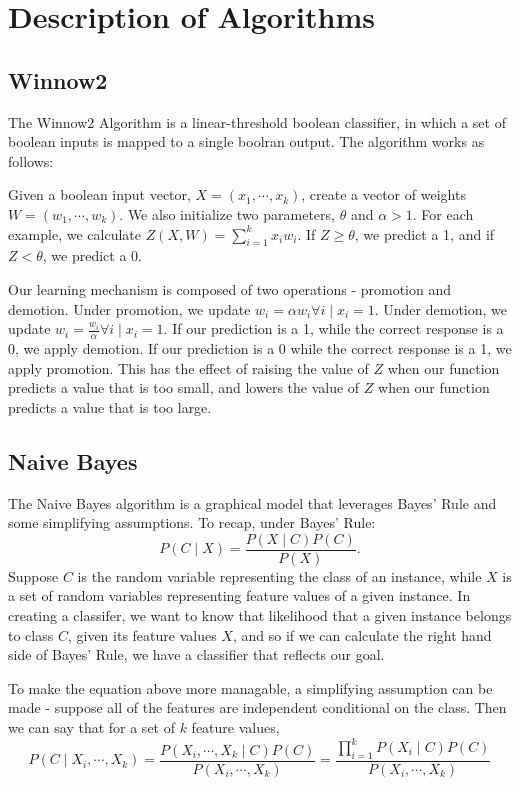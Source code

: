 \documentclass{amsart}
\begin{document}
    \section{Description of Algorithms}
    \subsection*{Winnow2}
    The Winnow2 Algorithm is a linear-threshold boolean classifier, in which a set of boolean inputs is mapped
    to a single boolran output. The algorithm works as follows:

    Given a boolean input vector, $X = (x_1, \cdots, x_k)$,  create a vector of weights $W = (w_1, \cdots, w_k)$.
    We also initialize two parameters, $\theta$ and $\alpha > 1$.
    For each example, we calculate $Z(X, W) = \sum_{i=1}^k x_i w_i$. If $Z \geq \theta$, we
    predict a 1, and if $Z < \theta$, we predict a 0.

    Our learning mechanism is composed of two operations - promotion and demotion.
    Under promotion, we update $w_i = \alpha w_i \forall i \mid x_i = 1$. Under demotion,
    we update $w_i =  \frac{w_i}{\alpha} \forall i \mid x_i = 1$. If our prediction is a 1, while
    the correct response is a 0, we apply demotion. If our prediction is a 0 while the correct
    response is a 1, we apply promotion. This has the effect of raising the value of $Z$ when our
    function predicts a value that is too small, and lowers the value of $Z$ when our
    function predicts a value that is too large.


    \subsection*{Naive Bayes}
    The Naive Bayes algorithm is a graphical model that leverages Bayes' Rule and some simplifying
    assumptions. To recap, under Bayes' Rule:
    \[
        P(C \mid X) = \frac{P(X \mid C) P(C)}{P(X)}.
    \]
    Suppose $C $ is the random variable representing the class of an instance, while $X$ is a
    set of random variables representing feature values of a given instance. In creating a classifer,
    we want to know that likelihood that a given instance belongs to class $C$, given its feature values $X$,
    and so if we can calculate the right hand side of Bayes' Rule, we have a classifier that reflects our goal.

    To make the equation above more managable, a simplifying assumption can be made - suppose all
    of the features are independent conditional on the class. Then we can say that for a set
    of $k$ feature values,
    \[
        P(C \mid X_i, \cdots, X_k ) = \frac{
            P(X_i, \cdots, X_k\mid C) P(C)
        }{P(X_i, \cdots, X_k)}
        = \frac{
            \prod_{i=1}^k P(X_i \mid C) P(C)
        }{P(X_i, \cdots, X_k)}
    \]
\end{document}
